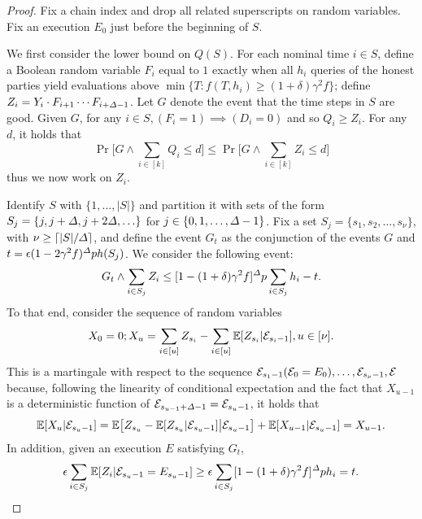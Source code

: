 \begin{proof}
    Fix a chain index and drop all related superscripts on random variables.
    Fix an execution $E_0$ just before the beginning of $S$.

    We first consider the lower bound on $Q(S)$.
    For each nominal time $i \in S$, define a Boolean random variable $F_i$ equal to $1$ exactly when all $h_i$ queries of the honest parties yield evaluations above $\min \{T : f (T, h_i) \ge (1 + \delta) \gamma^2 f \}$; define $Z_i = Y_i \cdot F_{i + 1} \cdots F_{i + \varDelta - 1}$.
    Let $G$ denote the event that the time steps in $S$ are good.
    Given $G$, for any $i \in S, (F_i = 1) \implies (D_i = 0)$ and so $Q_i \ge Z_i$.
    For any $d$, it holds that
    \[ \Pr \Big[ G \wedge \sum_{i \in [k]} Q_i \le d \Big] \le \Pr \Big[ G \wedge \sum_{i \in [k]} Z_i \le d \Big] \]
    thus we now work on $Z_i$.

    Identify $S$ with $\{1, \ldots, |S|\}$ and partition it with sets of the form $S_j = \{j, j + \varDelta, j + 2\varDelta, \ldots \}$ for $j \in \{ 0, 1, \ldots, \varDelta - 1 \}$.
    Fix a set $S_j = \{s_1, s_2, \ldots , s_\nu \}$, with $\nu \ge \lceil |S| / \varDelta \rceil$, and define the event $G_t$ as the conjunction of the events $G$ and $t = \epsilon(1 - 2\gamma^2f )^\varDelta p h(S_j)$.
    We consider the following event:
    \[ G_t \wedge \sum_{i \in S_j} Z_i \le [1 - (1 + \delta) \gamma^2 f]^\varDelta p \sum_{i \in S_j} h_i - t. \]
    To that end, consider the sequence of random variables
    \[ X_0 = 0; X_u = \sum_{i \in [u]} Z_{s_i} - \sum_{i \in [u]} \mathbb{E}[Z_{s_i} | \mathcal{E}_{s_i - 1}], u \in [\nu]. \]
    This is a martingale with respect to the sequence $\mathcal{E}_{s_1 - 1}(\mathcal{E}_0 = E_0), \ldots, \mathcal{E}_{s_\nu - 1}, \mathcal{E}$ because, following the linearity of conditional expectation and the fact that $X_{u - 1}$ is a deterministic function of $\mathcal{E}_{s_{u - 1} + \varDelta - 1} = \mathcal{E}_{s_u - 1}$, it holds that
    \[ \mathbb{E}[X_u | \mathcal{E}_{s_u - 1}] = \mathbb{E} \big[ Z_{s_u} - \mathbb{E} [ Z_{s_u} | \mathcal{E}_{s_u - 1}] \big| \mathcal{E}_{s_u - 1} \big] + \mathbb{E} [X_{u - 1} | \mathcal{E}_{s_u - 1}] = X_{u - 1}. \]
    In addition, given an execution $E$ satisfying $G_t$,
    \[ \epsilon \sum_{i \in S_j} \mathbb{E} [Z_i | \mathcal{E}_{s_u - 1} = E_{s_u - 1}] \ge \epsilon \sum_{i \in S_j} [1 - (1 + \delta) \gamma^2 f]^\varDelta p h_i = t. \]


\end{proof}
